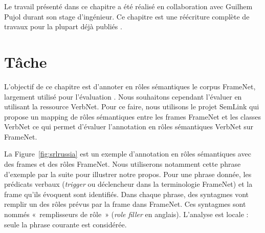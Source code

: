 Le travail présenté dans ce chapitre a été réalisé en collaboration avec
Guilhem Pujol durant son stage d'ingénieur. Ce chapitre est une réécriture
complète de travaux pour la plupart déjà publiés \citep{pradet2013revisiting}.

\section{Tâche}

L'objectif de ce chapitre est d'annoter en rôles sémantiques le corpus
FrameNet, largement utilisé pour l'évaluation
\citep{baker2007semeval,das2010probabilistic}. Nous souhaitons cependant
l'évaluer en utilisant la ressource VerbNet. Pour ce faire, nous utilisons le
projet SemLink \citep{bonial2012empirically} qui propose un mapping de rôles
sémantiques entre les frames FrameNet et les classes VerbNet ce qui permet
d'évaluer l'annotation en rôles sémantiques VerbNet sur FrameNet.

La Figure~\ref{fig:srlrussia} est un exemple d'annotation en rôles sémantiques
avec des frames et des rôles FrameNet. Nous utiliserons notamment cette phrase
d'exemple par la suite pour illustrer notre propos. Pour une phrase donnée, les
prédicats verbaux (\textit{trigger} ou déclencheur dans la terminologie FrameNet)
et la frame qu'ils évoquent sont identifiés. Dans chaque phrase, des syntagmes
vont remplir un des rôles prévus par la frame dans FrameNet. Ces syntagmes sont
nommés «~remplisseurs de rôle~» (\textit{role filler} en anglais). L'analyse
est locale : seule la phrase courante est considérée.


